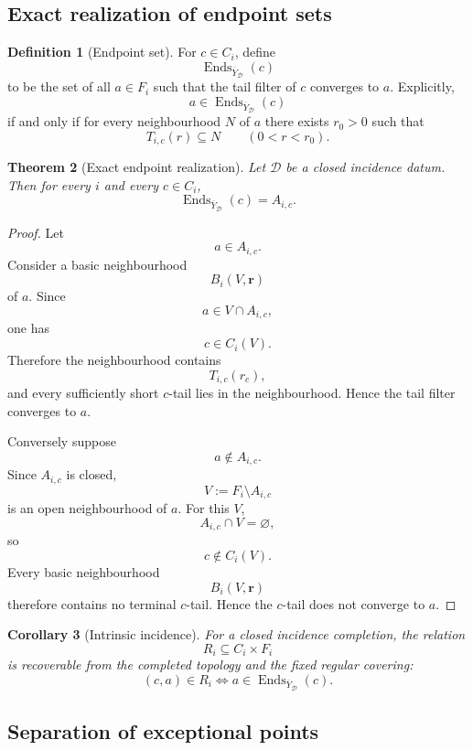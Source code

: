 \documentclass[11pt]{article}
\theoremstyle{plain}
\newtheorem{theorem}{Theorem}[section]
\newtheorem{corollary}[theorem]{Corollary}
\theoremstyle{definition}
\newtheorem{definition}[theorem]{Definition}
\begin{document}
\subsection{Exact realization of endpoint sets}
\label{subsec:exact-endpoints}


\begin{definition}[Endpoint set]
\label{def:peripheral-endpoint-set}
For $c\in C_i$, define
\[
\operatorname{Ends}_{\overline Y_{\mathcal D}}(c)
\]
to be the set of all $a\in F_i$ such that the tail filter of $c$ converges
to $a$.  Explicitly,
\[
a\in\operatorname{Ends}_{\overline Y_{\mathcal D}}(c)
\]
if and only if for every neighbourhood $N$ of $a$ there exists
$r_0>0$ such that
\[
T_{i,c}(r)\subseteq N
\qquad
(0<r<r_0).
\]
\end{definition}

\begin{theorem}[Exact endpoint realization]
\label{thm:exact-endpoint-realization}
Let $\mathcal D$ be a closed incidence datum.  Then for every
$i$ and every $c\in C_i$,
\[
\operatorname{Ends}_{\overline Y_{\mathcal D}}(c)
=
A_{i,c}.
\]
\end{theorem}

\begin{proof}
Let
\[
a\in A_{i,c}.
\]
Consider a basic neighbourhood
\[
B_i(V,\mathbf r)
\]
of $a$.  Since
\[
a\in V\cap A_{i,c},
\]
one has
\[
c\in C_i(V).
\]
Therefore the neighbourhood contains
\[
T_{i,c}(r_c),
\]
and every sufficiently short $c$-tail lies in the neighbourhood.  Hence
the tail filter converges to $a$.

Conversely suppose
\[
a\notin A_{i,c}.
\]
Since $A_{i,c}$ is closed,
\[
V:=F_i\setminus A_{i,c}
\]
is an open neighbourhood of $a$.  For this $V$,
\[
A_{i,c}\cap V=\varnothing,
\]
so
\[
c\notin C_i(V).
\]
Every basic neighbourhood
\[
B_i(V,\mathbf r)
\]
therefore contains no terminal $c$-tail.  Hence the $c$-tail does not
converge to $a$.
\end{proof}

\begin{corollary}[Intrinsic incidence]
\label{cor:intrinsic-incidence}
For a closed incidence completion, the relation
\[
R_i\subseteq C_i\times F_i
\]
is recoverable from the completed topology and the fixed regular
covering:
\[
(c,a)\in R_i
\iff
a\in\operatorname{Ends}_{\overline Y_{\mathcal D}}(c).
\]
\end{corollary}


\subsection{Separation of exceptional points}
\label{subsec:incidence-separation}
\end{document}
